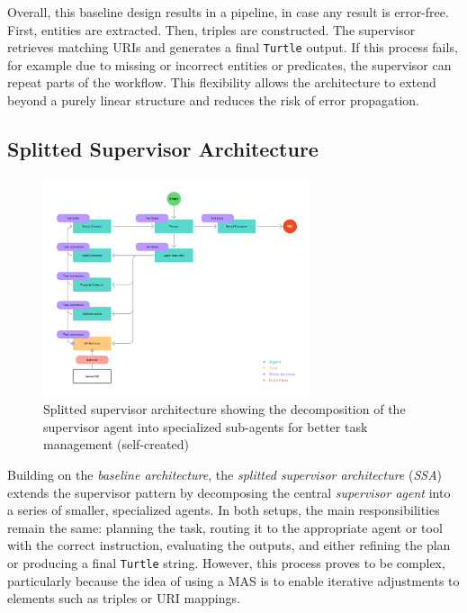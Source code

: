 \documentclass[a4paper,oneside,bibliography=totoc]{scrbook}
\begin{document}
Overall, this baseline design results in a pipeline, in case any result is error-free. First, entities are extracted. Then, triples are constructed. The supervisor retrieves matching \acp{URI} and generates a final \texttt{Turtle} output. If this process fails, for example due to missing or incorrect entities or predicates, the supervisor can repeat parts of the workflow. This flexibility allows the architecture to extend beyond a purely linear structure and reduces the risk of error propagation.

\subsection{Splitted Supervisor Architecture}
\label{subsec:supervisor}

\begin{figure}[tp]
  \centering
  \includegraphics[width=0.7\textwidth]{figures/Splitted Supervisor Architecture.png}
  \caption[Splitted supervisor architecture showing the decomposition of the supervisor agent into specialized sub-agents for better task management]{Splitted supervisor architecture showing the decomposition of the supervisor agent into specialized sub-agents for better task management (self-created)}
  \label{fig:splitted_supervisor_architecture}
\end{figure}

Building on the \textit{baseline architecture}, the \textit{splitted supervisor architecture} (\textit{\ac{SSA}}) extends the supervisor pattern by decomposing the central \textit{supervisor agent} into a series of smaller, specialized agents. In both setups, the main responsibilities remain the same: planning the task, routing it to the appropriate agent or tool with the correct instruction, evaluating the outputs, and either refining the plan or producing a final \texttt{Turtle} string. However, this process proves to be complex, particularly because the idea of using a \ac{MAS} is to enable iterative adjustments to elements such as triples or \ac{URI} mappings.
\end{document}
